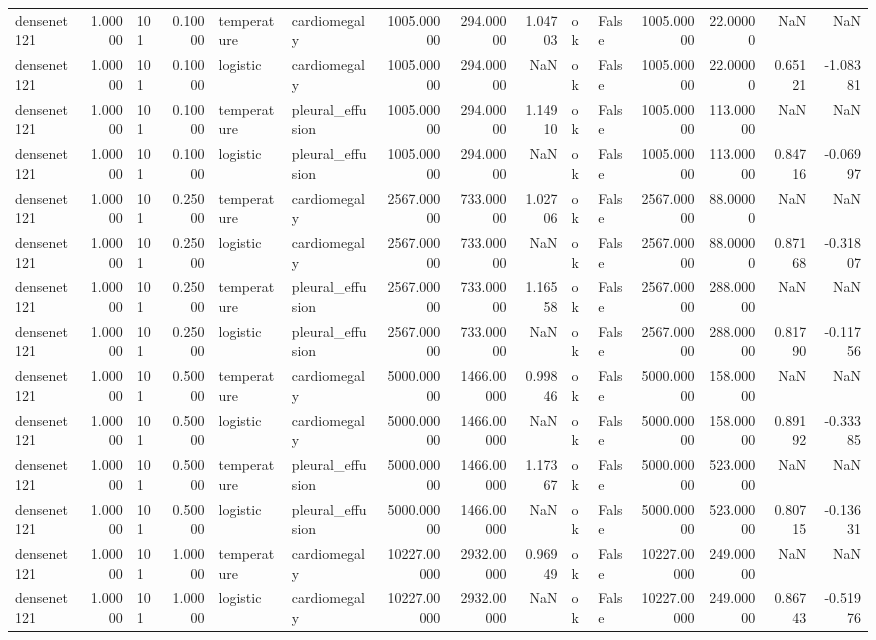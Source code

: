 \begin{tabular}{lrlrllrrrllrrrr}
densenet121 & 1.00000 & 101 & 0.10000 & temperature & cardiomegaly & 1005.00000 & 294.00000 & 1.04703 & ok & False & 1005.00000 & 22.00000 & NaN & NaN \\
densenet121 & 1.00000 & 101 & 0.10000 & logistic & cardiomegaly & 1005.00000 & 294.00000 & NaN & ok & False & 1005.00000 & 22.00000 & 0.65121 & -1.08381 \\
densenet121 & 1.00000 & 101 & 0.10000 & temperature & pleural\_effusion & 1005.00000 & 294.00000 & 1.14910 & ok & False & 1005.00000 & 113.00000 & NaN & NaN \\
densenet121 & 1.00000 & 101 & 0.10000 & logistic & pleural\_effusion & 1005.00000 & 294.00000 & NaN & ok & False & 1005.00000 & 113.00000 & 0.84716 & -0.06997 \\
densenet121 & 1.00000 & 101 & 0.25000 & temperature & cardiomegaly & 2567.00000 & 733.00000 & 1.02706 & ok & False & 2567.00000 & 88.00000 & NaN & NaN \\
densenet121 & 1.00000 & 101 & 0.25000 & logistic & cardiomegaly & 2567.00000 & 733.00000 & NaN & ok & False & 2567.00000 & 88.00000 & 0.87168 & -0.31807 \\
densenet121 & 1.00000 & 101 & 0.25000 & temperature & pleural\_effusion & 2567.00000 & 733.00000 & 1.16558 & ok & False & 2567.00000 & 288.00000 & NaN & NaN \\
densenet121 & 1.00000 & 101 & 0.25000 & logistic & pleural\_effusion & 2567.00000 & 733.00000 & NaN & ok & False & 2567.00000 & 288.00000 & 0.81790 & -0.11756 \\
densenet121 & 1.00000 & 101 & 0.50000 & temperature & cardiomegaly & 5000.00000 & 1466.00000 & 0.99846 & ok & False & 5000.00000 & 158.00000 & NaN & NaN \\
densenet121 & 1.00000 & 101 & 0.50000 & logistic & cardiomegaly & 5000.00000 & 1466.00000 & NaN & ok & False & 5000.00000 & 158.00000 & 0.89192 & -0.33385 \\
densenet121 & 1.00000 & 101 & 0.50000 & temperature & pleural\_effusion & 5000.00000 & 1466.00000 & 1.17367 & ok & False & 5000.00000 & 523.00000 & NaN & NaN \\
densenet121 & 1.00000 & 101 & 0.50000 & logistic & pleural\_effusion & 5000.00000 & 1466.00000 & NaN & ok & False & 5000.00000 & 523.00000 & 0.80715 & -0.13631 \\
densenet121 & 1.00000 & 101 & 1.00000 & temperature & cardiomegaly & 10227.00000 & 2932.00000 & 0.96949 & ok & False & 10227.00000 & 249.00000 & NaN & NaN \\
densenet121 & 1.00000 & 101 & 1.00000 & logistic & cardiomegaly & 10227.00000 & 2932.00000 & NaN & ok & False & 10227.00000 & 249.00000 & 0.86743 & -0.51976 \\

\end{tabular}
